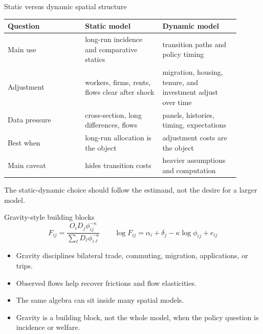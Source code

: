 \documentclass[aspectratio=169,11pt]{beamer}
\newcommand{\1}{\mathbf{1}}
\begin{document}
\begin{frame}{Static versus dynamic spatial structure}
\small
\begin{tabular}{p{0.30\linewidth} p{0.30\linewidth} p{0.30\linewidth}}
\toprule
Question & Static model & Dynamic model \\
\midrule
Main use & long-run incidence and comparative statics & transition paths and policy timing \\
Adjustment & workers, firms, rents, flows clear after shock & migration, housing, tenure, and investment adjust over time \\
Data pressure & cross-section, long differences, flows & panels, histories, timing, expectations \\
Best when & long-run allocation is the object & adjustment costs are the object \\
Main caveat & hides transition costs & heavier assumptions and computation \\
\bottomrule
\end{tabular}

\medskip
The static-dynamic choice should follow the estimand, not the desire for a larger model.
\end{frame}

\begin{frame}{Gravity-style building blocks}
\small
\[
F_{ij}
=
\frac{O_iD_j\phi_{ij}^{-\kappa}}
{\sum_{\ell}D_{\ell}\phi_{i\ell}^{-\kappa}}
\qquad
\log F_{ij}
=
\alpha_i+\delta_j-\kappa\log \phi_{ij}+e_{ij}
\]

\begin{itemize}
    \item Gravity disciplines bilateral trade, commuting, migration, applications, or trips.
    \item Observed flows help recover frictions and flow elasticities.
    \item The same algebra can sit inside many spatial models.
    \item Gravity is a building block, not the whole model, when the policy question is incidence or welfare.
\end{itemize}
\end{frame}
\end{document}
